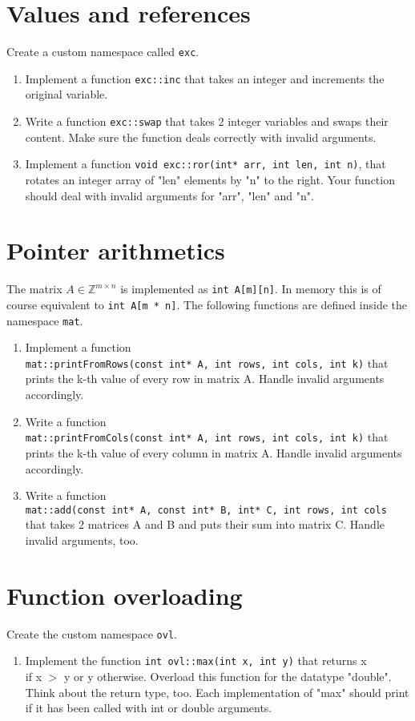 \documentclass[12pt, a4paper]{article}
\begin{document}
\section*{Values and references}
Create a custom namespace called \lstinline{exc}.
\begin{enumerate}
    \item Implement a function \lstinline{exc::inc} that takes an integer and increments the original variable.
    \item Write a function \lstinline{exc::swap} that takes 2 integer variables and swaps their content. Make sure the function deals correctly with invalid arguments.
    \item Implement a function \lstinline{void exc::ror(int* arr, int len, int n)}, that rotates an integer array of "len" elements by "n" to the right. Your function should deal with invalid arguments for "arr", "len" and "n".
\end{enumerate}
\section*{Pointer arithmetics}
    The matrix $A \in \mathbb{Z}^{m \times n}$ is implemented as \lstinline{int A[m][n]}. In memory this is of course equivalent to \lstinline{int A[m * n]}. The following functions are defined inside the namespace \lstinline{mat}.
\begin{enumerate}
    \item Implement a function \\ \lstinline{mat::printFromRows(const int* A, int rows, int cols, int k)} that prints the k-th value of every row in matrix A. Handle invalid arguments accordingly.
    \item Write a function \\ \lstinline{mat::printFromCols(const int* A, int rows, int cols, int k)} that prints the k-th value of every column in matrix A. Handle invalid arguments accordingly.
    \item Write a function \\ \lstinline{mat::add(const int* A, const int* B, int* C, int rows, int cols} that takes 2 matrices A and B and puts their sum into matrix C. Handle invalid arguments, too.
\end{enumerate}
\section*{Function overloading}
    Create the custom namespace \lstinline{ovl}.
\begin{enumerate}
    \item Implement the function \lstinline{int ovl::max(int x, int y)} that returns x \\ if x $>$ y or y otherwise. Overload this function for the datatype "double". Think about the return type, too. Each implementation of "max" should print if it has been called with int or double arguments.
\end{enumerate}
\end{document}
